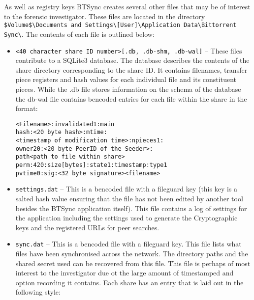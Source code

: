 \documentclass[final,5p,times,twocolumn]{elsarticle}
\begin{document}
As well as registry keys BTSync creates several other files that may be of interest to the forensic investigator. These files are located in the directory \texttt{\$Volume\$\textbackslash Documents and Settings\textbackslash [User]\textbackslash Application Data\textbackslash Bittorrent Sync\textbackslash}. The contents of each file is outlined below:

\begin{itemize}
\item \texttt{<40 character share ID number>[.db, .db-shm, .db-wal]} -- These files contribute to a SQLite3 database. The database describes the contents of the share directory corresponding to the share ID. It contains filenames, transfer piece registers and hash values for each individual file and its constituent pieces. While the .db file stores information on the schema of the database the db-wal file contains bencoded entries for each file within the share in the format:

\texttt{<Filename>:invalidated1:main} \\
\texttt{hash:<20 byte hash>:mtime:} \\
\texttt{<timestamp of modification time>:npieces1:} \\
\texttt{owner20:<20 byte PeerID of the Seeder>:} \\
\texttt{path<path to file within share>} \\
\texttt{perm:420:size[bytes]:state1:timestamp:type1}  \\
\texttt{pvtime0:sig:<32 byte signature><filename>} \\

\item \texttt{settings.dat} -- This is a bencoded file with a fileguard key (this key is a salted hash value ensuring that the file has not been edited by another tool besides the BTSync application itself). This file contains a log of settings for the application including the settings used to generate the Cryptographic keys and the registered URLs for peer searches.
\item \texttt{sync.dat} -- This is a bencoded file with a fileguard key. This file lists what files have been synchronised across the network. The directory paths and the shared secret used can be recovered from this file. This file is perhaps of most interest to the investigator due ot the large amount of timestamped and option recording it contains. Each share has an entry that is laid out in the following style:


\end{itemize}
\end{document}
